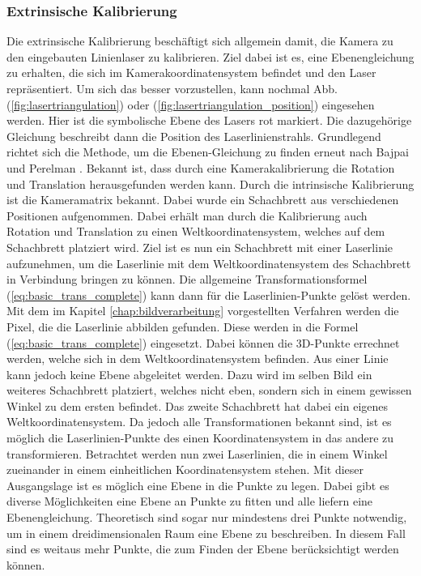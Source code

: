 		\subsubsection{Extrinsische Kalibrierung}
		Die extrinsische Kalibrierung beschäftigt sich allgemein damit, die Kamera zu den eingebauten Linienlaser zu kalibrieren. Ziel dabei ist es, eine Ebenengleichung zu erhalten, die sich im Kamerakoordinatensystem befindet und den Laser repräsentiert. Um sich das besser vorzustellen, kann nochmal Abb. (\ref{fig:lasertriangulation}) oder (\ref{fig:lasertriangulation_position}) eingesehen werden. Hier ist die symbolische Ebene des Lasers rot markiert. Die dazugehörige Gleichung beschreibt dann die Position des Laserlinienstrahls. Grundlegend richtet sich die Methode, um die Ebenen-Gleichung zu finden erneut nach Bajpai und Perelman \citep{bajpai_cross-platform_nodate}. \newline
		Bekannt ist, dass durch eine Kamerakalibrierung die Rotation und Translation herausgefunden werden kann. Durch die intrinsische Kalibrierung ist die Kameramatrix bekannt. Dabei wurde ein Schachbrett aus verschiedenen Positionen aufgenommen. Dabei erhält man durch die Kalibrierung auch Rotation und Translation zu einen Weltkoordinatensystem, welches auf dem Schachbrett platziert wird. Ziel ist es nun ein Schachbrett mit einer Laserlinie aufzunehmen, um die Laserlinie mit dem Weltkoordinatensystem des Schachbrett in Verbindung bringen zu können. Die allgemeine Transformationsformel (\ref{eq:basic_trans_complete}) kann dann für die Laserlinien-Punkte gelöst werden. Mit dem im Kapitel \ref{chap:bildverarbeitung} vorgestellten Verfahren werden die Pixel, die die Laserlinie abbilden gefunden. Diese werden in die Formel (\ref{eq:basic_trans_complete}) eingesetzt. Dabei können die 3D-Punkte errechnet werden, welche sich in dem Weltkoordinatensystem befinden. Aus einer Linie kann jedoch keine Ebene abgeleitet werden. Dazu wird im selben Bild ein weiteres Schachbrett platziert, welches nicht eben, sondern sich in einem gewissen Winkel zu dem ersten befindet. Das zweite Schachbrett hat dabei ein eigenes Weltkoordinatensystem. Da jedoch alle Transformationen bekannt sind, ist es möglich die Laserlinien-Punkte des einen Koordinatensystem in das andere zu transformieren. Betrachtet werden nun zwei Laserlinien, die in einem Winkel zueinander in einem einheitlichen Koordinatensystem stehen. Mit dieser Ausgangslage ist es möglich eine Ebene in die Punkte zu legen. Dabei gibt es diverse Möglichkeiten eine Ebene an Punkte zu fitten und alle liefern eine Ebenengleichung. Theoretisch sind sogar nur mindestens drei Punkte notwendig, um in einem dreidimensionalen Raum eine Ebene zu beschreiben. In diesem Fall sind es weitaus mehr Punkte, die zum Finden der Ebene berücksichtigt werden können. \newline

